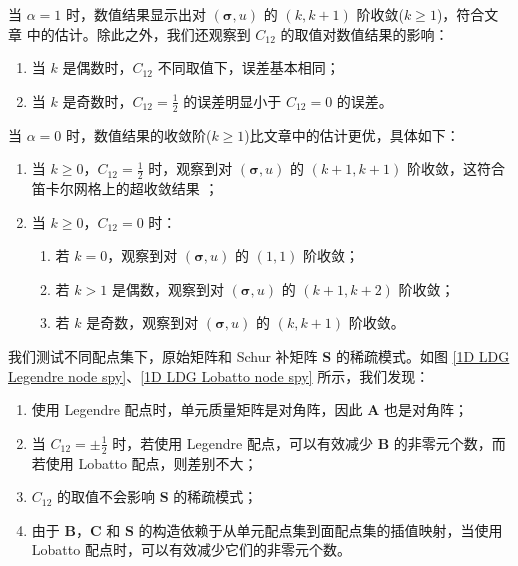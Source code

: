 当 \(\alpha = 1\) 时，数值结果显示出对 \((\bm\sigma, u)\) 的 \((k, k+1)\) 阶收敛(\(k \geqslant 1\))，符合文章 \cite{10.1137/S0036142900371003} 中的估计。除此之外，我们还观察到 \(C_{12}\) 的取值对数值结果的影响：
\begin{enumerate}
	\item 当 \(k\) 是偶数时，\(C_{12}\) 不同取值下，误差基本相同；
	\item 当 \(k\) 是奇数时，\(C_{12} = \frac{1}{2}\) 的误差明显小于 \(C_{12} = 0\) 的误差。
\end{enumerate}

当 \(\alpha = 0\) 时，数值结果的收敛阶(\(k \geqslant 1\))比文章\cite{10.1137/S0036142900371003}中的估计更优，具体如下：
\begin{enumerate}
	\item 当 \(k\geqslant 0\)，\(C_{12} = \frac{1}{2}\) 时，观察到对 \((\bm\sigma, u)\) 的 \((k+1, k+1)\) 阶收敛，这符合笛卡尔网格上的超收敛结果 \cite{10.1090/S0025-5718-01-01317-5, 10.1137/S0036142900371544}；
	\item 当 \(k \geqslant 0\)，\(C_{12} = 0\) 时：\begin{enumerate}
		\item 若 \(k = 0\)，观察到对 \((\bm\sigma, u)\) 的 \((1, 1)\) 阶收敛；
		\item 若 \(k > 1\) 是偶数，观察到对 \((\bm\sigma, u)\) 的 \((k+1, k+2)\) 阶收敛；
		\item 若 \(k\) 是奇数，观察到对 \((\bm\sigma, u)\) 的 \((k, k+1)\) 阶收敛。
	\end{enumerate}
\end{enumerate}

我们测试不同配点集下，原始矩阵和 Schur 补矩阵 \(\bm S\) 的稀疏模式。如图 \ref{1D LDG Legendre node spy}、\ref{1D LDG Lobatto node spy} 所示，我们发现：
\begin{enumerate}
	\item 使用 Legendre 配点时，单元质量矩阵是对角阵，因此 \(\bm A\) 也是对角阵；
	\item 当 \(C_{12} = \pm\frac{1}{2}\) 时，若使用 Legendre 配点，可以有效减少 \(\bm B\) 的非零元个数，而若使用 Lobatto 配点，则差别不大；
	\item \(C_{12}\) 的取值不会影响 \(\bm S\) 的稀疏模式；
	\item 由于 \(\bm B\)，\(\bm C\) 和 \(\bm S\) 的构造依赖于从单元配点集到面配点集的插值映射，当使用 Lobatto 配点时，可以有效减少它们的非零元个数。
\end{enumerate}

